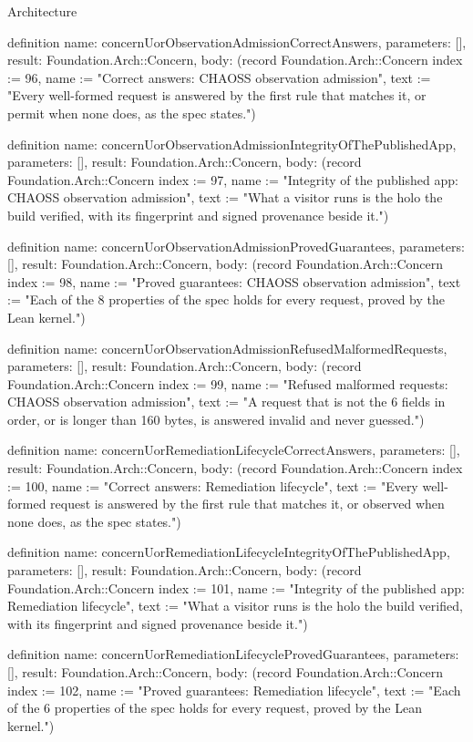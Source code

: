 \begin{lexlean}{Architecture}
\begin{semanticmodule}
definition{
  name: concernUorObservationAdmissionCorrectAnswers,
  parameters: [],
  result: Foundation.Arch::Concern,
  body: (record Foundation.Arch::Concern {index := 96, name := "Correct answers: CHAOSS observation admission", text := "Every well-formed request is answered by the first rule that matches it, or permit when none does, as the spec states."})
}

definition{
  name: concernUorObservationAdmissionIntegrityOfThePublishedApp,
  parameters: [],
  result: Foundation.Arch::Concern,
  body: (record Foundation.Arch::Concern {index := 97, name := "Integrity of the published app: CHAOSS observation admission", text := "What a visitor runs is the holo the build verified, with its fingerprint and signed provenance beside it."})
}

definition{
  name: concernUorObservationAdmissionProvedGuarantees,
  parameters: [],
  result: Foundation.Arch::Concern,
  body: (record Foundation.Arch::Concern {index := 98, name := "Proved guarantees: CHAOSS observation admission", text := "Each of the 8 properties of the spec holds for every request, proved by the Lean kernel."})
}

definition{
  name: concernUorObservationAdmissionRefusedMalformedRequests,
  parameters: [],
  result: Foundation.Arch::Concern,
  body: (record Foundation.Arch::Concern {index := 99, name := "Refused malformed requests: CHAOSS observation admission", text := "A request that is not the 6 fields in order, or is longer than 160 bytes, is answered invalid and never guessed."})
}

definition{
  name: concernUorRemediationLifecycleCorrectAnswers,
  parameters: [],
  result: Foundation.Arch::Concern,
  body: (record Foundation.Arch::Concern {index := 100, name := "Correct answers: Remediation lifecycle", text := "Every well-formed request is answered by the first rule that matches it, or observed when none does, as the spec states."})
}

definition{
  name: concernUorRemediationLifecycleIntegrityOfThePublishedApp,
  parameters: [],
  result: Foundation.Arch::Concern,
  body: (record Foundation.Arch::Concern {index := 101, name := "Integrity of the published app: Remediation lifecycle", text := "What a visitor runs is the holo the build verified, with its fingerprint and signed provenance beside it."})
}

definition{
  name: concernUorRemediationLifecycleProvedGuarantees,
  parameters: [],
  result: Foundation.Arch::Concern,
  body: (record Foundation.Arch::Concern {index := 102, name := "Proved guarantees: Remediation lifecycle", text := "Each of the 6 properties of the spec holds for every request, proved by the Lean kernel."})
}


\end{semanticmodule}
\end{lexlean}
